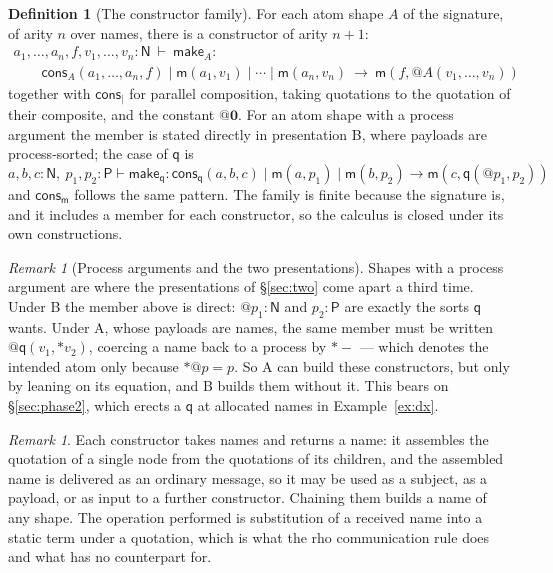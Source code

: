 \documentclass[11pt]{article}
\makeatletter
\theoremstyle{plain}
\theoremstyle{definition}
\newtheorem{definition}[theorem]{Definition}
\theoremstyle{remark}
\newtheorem{remark}[theorem]{Remark}
\newcommand{\quo}[1]{@#1}
\newcommand{\drp}[1]{{*}#1}
\newcommand{\nil}{\mathbf{0}}
\newcommand{\mm}{\mathsf{m}}
\newcommand{\qq}{\mathsf{q}}
\newcommand{\cons}{\mathsf{cons}}
\newcommand{\red}{\longrightarrow}
\makeatother
\begin{document}
\begin{definition}[The constructor family]
\label{def:consfamily}
For each atom shape $A$ of the signature, of arity $n$ over names, there is a
constructor of arity $n+1$:
\[
\begin{array}{l}
  a_{1},\dots,a_{n},f,v_{1},\dots,v_{n} : \mathsf{N} \ \vdash\ \mathsf{make}_{A} :\\[3pt]
  \qquad \cons_{A}(a_{1},\dots,a_{n},f) \mid \mm(a_{1},v_{1}) \mid \cdots \mid
  \mm(a_{n},v_{n})
  \ \red\ \mm(f,\quo{A(v_{1},\dots,v_{n})})
\end{array}
\]
together with $\cons_{\mid}$ for parallel composition, taking quotations to
the quotation of their composite, and the constant $\quo{\nil}$.
For an atom shape with a process argument the member is stated directly in
presentation B, where payloads are process-sorted; the case of $\qq$ is
\[
  a,b,c : \mathsf{N},\ p_{1},p_{2} : \mathsf{P} \vdash \mathsf{make}_{\qq} :
  \cons_{\qq}(a,b,c) \mid \mm(a,p_{1}) \mid \mm(b,p_{2})
  \red \mm(c, \qq(\quo{p_{1}}, p_{2}))
\]
and $\cons_{\mm}$ follows the same pattern. The family is finite because the
signature is, and it includes a member for each constructor, so the calculus
is closed under its own constructions.
\end{definition}

\begin{remark}[Process arguments and the two presentations]
\label{rem:consq}
Shapes with a process argument are where the presentations of
\S\ref{sec:two} come apart a third time. Under B the member above is
direct: $\quo{p_{1}} : \mathsf{N}$ and $p_{2} : \mathsf{P}$ are exactly the
sorts $\qq$ wants. Under A, whose payloads are names, the same member must
be written $\quo{\qq(v_{1}, \drp{v_{2}})}$, coercing a name back to a
process by $\drp{-}$ --- which denotes the intended atom only because
$\drp{\quo{p}} = p$. So A can build these constructors, but only by leaning
on its equation, and B builds them without it. This bears on
\S\ref{sec:phase2}, which erects a $\qq$ at allocated names in
Example~\ref{ex:dx}.
\end{remark}

\begin{remark}
Each constructor takes names and returns a name: it assembles the quotation
of a single node from the quotations of its children, and the assembled name
is delivered as an ordinary message, so it may be used as a subject, as a
payload, or as input to a further constructor. Chaining them builds a name of
any shape. The operation performed is substitution of a received name into a
static term under a quotation, which is what the rho communication rule does
and what \cite{rhocomb} has no counterpart for.
\end{remark}
\end{document}
